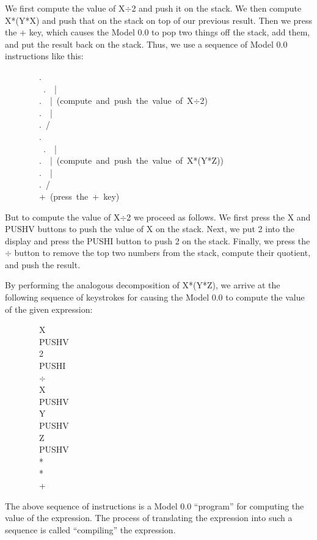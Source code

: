 \documentclass[10pt]{book}
\newenvironment{pubasis}{\begin{flushleft}}{\end{flushleft}}
\begin{document}
We  first compute
the value of X$\div$2 and push it on the stack.  We  then compute
X*(Y*X) and push that on the stack on top of
our previous result.  Then we
press the + key, which causes the Model 0.0 to pop
two things off the stack, add them, and put the result back on the
stack.  Thus, we  use a sequence of Model 0.0 instructions
like this:
\begin{pubasis}
~~~~~~~~.~\\\
~~~~~~~~.~~|\\
~~~~~~~~.~~|~(compute~and~push~the~value~of~X$\div$2)\\
~~~~~~~~.~~|\\
~~~~~~~~.~/\\

~~~~~~~~.~\\\
~~~~~~~~.~~|\\
~~~~~~~~.~~|~(compute~and~push~the~value~of~X*(Y*Z))\\
~~~~~~~~.~~|\\
~~~~~~~~.~/\\

~~~~~~~~+~(press~the~+~key)\\
\end{pubasis}
But to compute the value of X$\div$2 we proceed as follows.
We first press the X and PUSHV buttons to push the value
of X on the stack.  Next, we put 2 into the display and
press the PUSHI button to push 2 on the stack.
Finally, we press the $\div$ button to remove the
top two numbers from the stack, compute their quotient,
and push the result.

By performing the analogous decomposition of X*(Y*Z), we
arrive at the following sequence of keystrokes for causing the Model 0.0
to compute the value of the given expression:
\begin{pubasis}
~~~~~~~~X\\
~~~~~~~~PUSHV\\
~~~~~~~~2\\
~~~~~~~~PUSHI\\
~~~~~~~~$\div$\\
~~~~~~~~X\\
~~~~~~~~PUSHV\\
~~~~~~~~Y\\
~~~~~~~~PUSHV\\
~~~~~~~~Z\\
~~~~~~~~PUSHV\\
~~~~~~~~*\\
~~~~~~~~*\\
~~~~~~~~+\\
\end{pubasis}
The above sequence of instructions is  a Model 0.0 ``program'' for
computing the value of the expression.  The process of translating
the expression into such a sequence is called ``compiling'' the expression.
\end{document}
